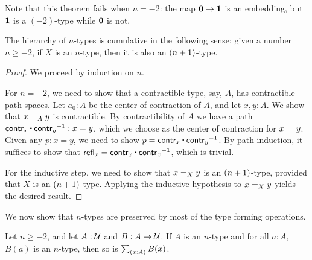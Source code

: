 Note that this theorem fails when $n=-2$: the map $\emptyt \to \unit$ is an embedding, but $\unit$ is a $(-2)$-type while $\emptyt$ is not.

\begin{thm}\label{thm:hlevel-cumulative}
 The hierarchy of $n$-types is cumulative in the following sense:
   given a number $n \geq -2$, if $X$ is an $n$-type, then it is also an $\nplusone$-type.
\end{thm}

\begin{proof}
 We proceed by induction on $n$.

 For $n = -2$, we need to show that a contractible type, say, $A$, has contractible path spaces.
       Let $a_0: A$ be the center of contraction of $A$, and let $x, y : A$. We show that $\id[A]{x}{y}$
       is contractible.
       By contractibility of $A$ we have a path $\contr_x \ct \opp{\contr_y} : x = y$, which we choose as
       the center of contraction for $\id{x}{y}$.
       Given any $p : x = y$, we need to show $p = \contr_x \ct \opp{\contr_y}$.
           By path induction, it suffices to show that
        $\refl{x} = \contr_x \ct \opp{\contr_x}$, which is trivial.

 For the inductive step, we need to show that $\id[X]{x}{y}$ is an $\nplusone$-type, provided
          that $X$ is an $\nplusone$-type. Applying the inductive hypothesis to $\id[X]{x}{y}$
         yields the desired result.
\end{proof}


We now show that  $n$-types are preserved by most of the type forming operations.

\begin{thm}\label{thm:ntypes-sigma}
 Let $n \geq -2$, and let $A : \type$ and $B : A \to \type$.
 If $A$ is an $n$-type and for all $a : A$, $B(a)$ is an $n$-type, then so is $\sm{x : A} B(x)$.
\end{thm}

